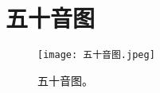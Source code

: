 \section{五十音图}%

\begin{figure}[b]
  \centering
  \texttt{[image: 五十音图.jpeg]}
  \caption{五十音图。}
  \label{fig:phonetic}
\end{figure}



